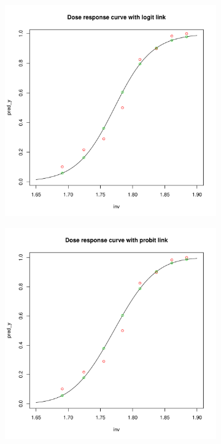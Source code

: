 \documentclass[]{article}
\begin{document}
\begin{enumerate}
{\begin{itemize}
            \begin{figure}[ht!]
            	\centering
            	\begin{subfigure}[b]{0.3\textwidth}
            		\includegraphics[width = \textwidth]{pic/HW3_1/a1.pdf}
            	\end{subfigure}
            	\begin{subfigure}[b]{0.3\textwidth}
            		\includegraphics[width = \textwidth]{pic/HW3_1/a2.pdf}

\end{subfigure}
\end{figure}
\end{itemize}}
\end{enumerate}
\end{document}

